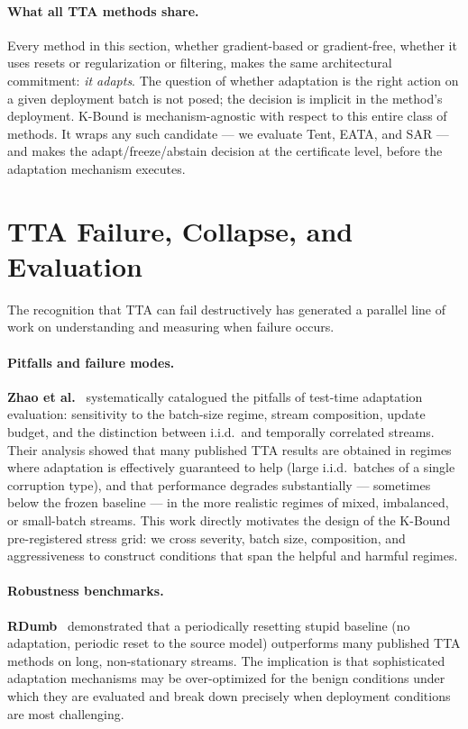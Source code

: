 \paragraph{What all TTA methods share.}
Every method in this section, whether gradient-based or gradient-free, whether
it uses resets or regularization or filtering, makes the same architectural
commitment: \emph{it adapts}.
The question of whether adaptation is the right action on a given deployment
batch is not posed; the decision is implicit in the method's deployment.
K-Bound is mechanism-agnostic with respect to this entire class of methods.
It wraps any such candidate --- we evaluate Tent, EATA, and SAR --- and
makes the adapt/freeze/abstain decision at the certificate level, before
the adaptation mechanism executes.

\section{TTA Failure, Collapse, and Evaluation}\label{sec:rel-failure}

The recognition that TTA can fail destructively has generated a parallel line
of work on understanding and measuring when failure occurs.

\paragraph{Pitfalls and failure modes.}
\textbf{Zhao et al.}~\cite{zhao2023pitfalls} systematically catalogued the
pitfalls of test-time adaptation evaluation: sensitivity to the batch-size
regime, stream composition, update budget, and the distinction between
i.i.d.\ and temporally correlated streams.
Their analysis showed that many published TTA results are obtained in regimes
where adaptation is effectively guaranteed to help (large i.i.d.\ batches of
a single corruption type), and that performance degrades substantially ---
sometimes below the frozen baseline --- in the more realistic regimes of mixed,
imbalanced, or small-batch streams.
This work directly motivates the design of the K-Bound pre-registered stress
grid: we cross severity, batch size, composition, and aggressiveness to
construct conditions that span the helpful and harmful regimes.

\paragraph{Robustness benchmarks.}
\textbf{RDumb}~\cite{press2023rdumb} demonstrated that a periodically
resetting stupid baseline (no adaptation, periodic reset to the source model)
outperforms many published TTA methods on long, non-stationary streams.
The implication is that sophisticated adaptation mechanisms may be
over-optimized for the benign conditions under which they are evaluated and
break down precisely when deployment conditions are most challenging.

